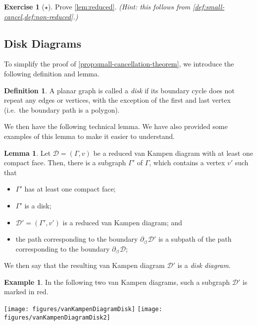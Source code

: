 \documentclass[11pt,a4paper,reqno]{amsart}
\theoremstyle{plain}
\theoremstyle{definition}
\newtheorem{lemma}[theorem]{Lemma}
\newtheorem{definition}[theorem]{Definition}
\theoremstyle{definition}
\newtheorem{exercise}[theorem]{Exercise}
\newtheorem{example}[theorem]{Example}
\newcommand\exerciseLevelEasy{$\star$}
\begin{document}
\begin{exercise}[\exerciseLevelEasy]
	Prove \cref{lem:reduced}. \textit{(Hint: this follows from \cref{def:small-cancel,def:non-reduced}.)}
\end{exercise}

\subsection{Disk Diagrams}
To simplify the proof of \cref{prop:small-cancellation-theorem}, we introduce the following definition and lemma.

\begin{definition}\label{def:disk-graph}
	A planar graph is called a \emph{disk} if its boundary cycle does not repeat any edges or vertices, with the exception of the first and last vertex (i.e.~the boundary path is a polygon).
\end{definition}

We then have the following technical lemma.
We have also provided some examples of this lemma to make it easier to understand.

\begin{lemma}\label{lem:reduction-to-disk-graph}
	Let $\mathcal D = (\Gamma, v)$ be a reduced van Kampen diagram with at least one compact face.
	Then, there is a subgraph $\Gamma'$ of $\Gamma$, which contains a vertex $v'$ such that
	\begin{itemize}
		\item $\Gamma'$ has at least one compact face;
		\item $\Gamma'$ is a disk;
		\item $\mathcal D' = (\Gamma', v')$ is a reduced van Kampen diagram; and
		\item the path corresponding to the boundary $\partial_\circlearrowleft \mathcal D'$ is a subpath of the path corresponding to the boundary $\partial_\circlearrowleft \mathcal D$;
	\end{itemize}
	We then say that the resulting van Kampen diagram $\mathcal D'$ is a \emph{disk diagram}.
\end{lemma}

\begin{example}
	In the following two van Kampen diagrams, such a subgraph $\mathcal D'$ is marked in red.

		{
			\hfill
			\texttt{[image: figures/vanKampenDiagramDisk]}
			\hfill
			\texttt{[image: figures/vanKampenDiagramDisk2]}
			\hfill
		}

\end{example}
\end{document}
